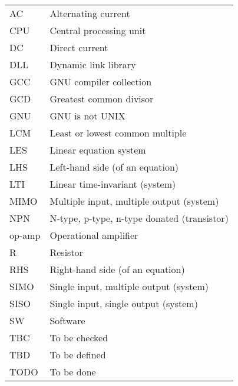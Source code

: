 \begin{longtable}[c]{|l|l|}
AC      & Alternating current                                  \\ 
CPU     & Central processing unit                              \\ 
DC      & Direct current                                       \\ 
DLL     & Dynamic link library                                 \\ 
GCC     & GNU compiler collection                              \\ 
GCD     & Greatest common divisor                              \\ 
GNU     & GNU is not UNIX                                      \\ 
LCM     & Least or lowest common multiple                      \\ 
LES     & Linear equation system                               \\ 
LHS     & Left-hand side (of an equation)                      \\ 
LTI     & Linear time-invariant (system)                       \\ 
MIMO    & Multiple input, multiple output (system)             \\ 
NPN     & N-type, p-type, n-type donated (transistor)          \\ 
op-amp  & Operational amplifier                                \\ 
R       & Resistor                                             \\ 
RHS     & Right-hand side (of an equation)                     \\ 
SIMO    & Single input, multiple output (system)               \\ 
SISO    & Single input, single output (system)                 \\ 
SW      & Software                                             \\ 
TBC     & To be checked                                        \\ 
TBD     & To be defined                                        \\ 
TODO    & To be done                                           \\
\hline

\end{longtable}
